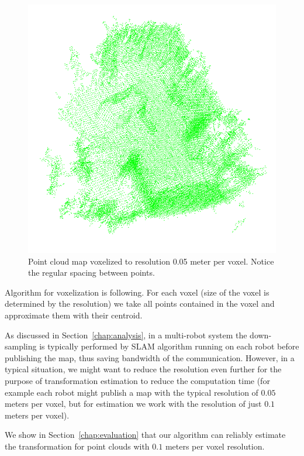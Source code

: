 \begin{figure}
    \centering
    \includegraphics[width=\textwidth]{../img/v1-downsampled.png}
    \caption[Voxelized point cloud map]{Point cloud map voxelized to resolution 0.05 meter per voxel. Notice the regular spacing between points.}
    \label{fig:v1-downsampled}
\end{figure}

Algorithm for voxelization is following. For each voxel (size of the voxel is determined by the resolution) we take all points contained in the voxel and approximate them with their centroid.

As discussed in Section~\ref{chap:analysis}, in a multi-robot system the down-sampling is typically performed by \gls{SLAM} algorithm running on each robot before publishing the map, thus saving bandwidth of the communication. However, in a typical situation, we might want to reduce the resolution even further for the purpose of transformation estimation to reduce the computation time (for example each robot might publish a map with the typical resolution of $0.05$ meters per voxel, but for estimation we work with the resolution of just $0.1$ meters per voxel).

We show in Section~\ref{chap:evaluation} that our algorithm can reliably estimate the transformation for point clouds with $0.1$ meters per voxel resolution.

